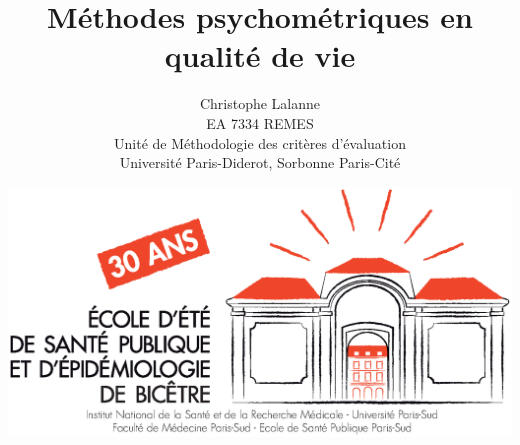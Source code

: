 

\title{Méthodes psychométriques en qualité de vie} 
\author{Christophe Lalanne\\EA 7334 REMES\\ Unité de Méthodologie des critères
  d’évaluation\\Université Paris-Diderot, Sorbonne Paris-Cité\\}
\date{\includegraphics[height=18ex]{logo.eps}}




\LogoOff
\maketitle
\rightfooter{\quad\textsf{\thepage}}












